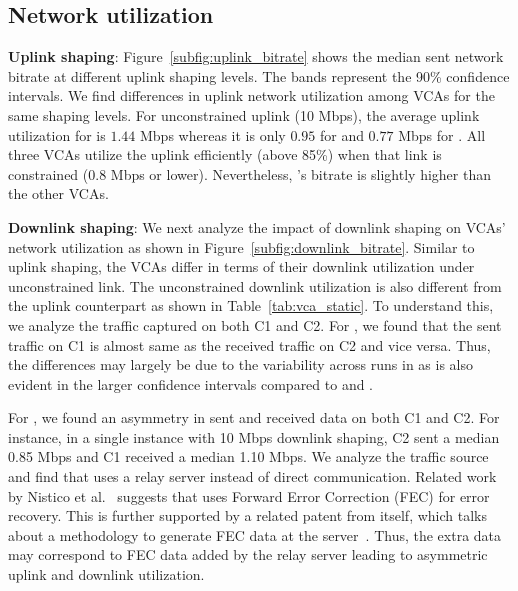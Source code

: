 


\subsection{Network utilization}
\label{subsec:network_utilization}
\textbf{Uplink shaping}: Figure~\ref{subfig:uplink_bitrate} shows the median sent network bitrate at different uplink shaping levels. The bands represent the 90\% confidence intervals. We find differences in uplink network utilization among VCAs for the same shaping levels. For unconstrained uplink (10 Mbps), the average uplink utilization for \teamsnative is $1.44$ Mbps whereas it is only $0.95$ for \meet and $0.77$ Mbps for \zoom. All three VCAs utilize the uplink efficiently (above 85\%) when that link is constrained (0.8 Mbps or lower).  Nevertheless, \meet's bitrate is slightly higher than the other VCAs.  


\textbf{Downlink shaping}: We next analyze the impact of downlink shaping on VCAs' network utilization as shown in Figure~\ref{subfig:downlink_bitrate}. Similar to uplink shaping, the VCAs differ in terms of their downlink utilization under unconstrained link. The unconstrained downlink utilization is also different from the uplink counterpart as shown in Table~\ref{tab:vca_static}. To understand this, we analyze the traffic captured on both C1 and C2. For \teams, we found that the sent traffic on C1 is almost same as the received traffic on C2 and vice versa. Thus, the differences may largely be due to the variability across runs in \teams as is also evident in the larger confidence intervals compared to \zoom and \meet. 

For \zoom, we found an asymmetry in sent and received data on both C1 and C2. For instance, in a single instance with 10 Mbps downlink shaping, C2 sent a median 0.85 Mbps and C1 received a median 1.10 Mbps. We analyze the traffic source and find that \zoom uses a relay server instead of direct communication. Related work by Nistico et al.~\cite{nistico2020comparative} suggests that \zoom uses Forward Error Correction (FEC) for error recovery. This is further supported by a related patent from \zoom itself, which talks about a methodology to generate FEC data at the server~\cite{liu2019error}. Thus, the extra data may correspond to FEC data added by the relay server leading to asymmetric uplink and downlink utilization.  

